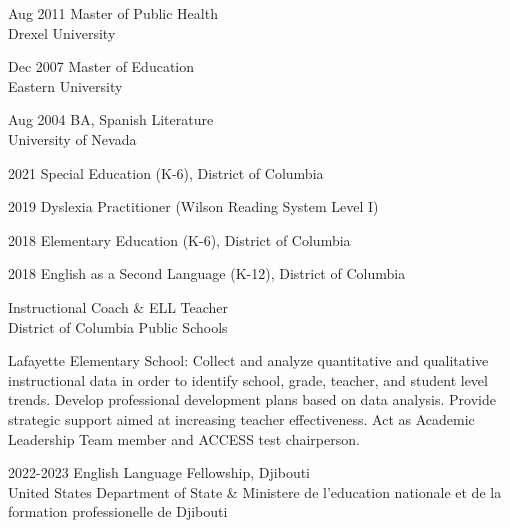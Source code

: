\documentclass[]{scrartcl}
\begin{document}
\begin{cleanCV}

  \vspace{-0.50em}

\WorkExperience
{Aug 2011}
{Master of Public Health}
{\\Drexel University}
\vspace{-0.5em}

\WorkExperience
{Dec 2007}
{Master of Education}
{\\Eastern University}
\vspace{-0.5em}

\WorkExperience
{Aug 2004}
{BA, Spanish Literature}
{\\University of Nevada}
\vspace{-0.5em}


\WorkExperience
{2021}
{}
{Special Education (K-6), District of Columbia}
\vspace{-1.25em}

\WorkExperience
{2019}
{}
{Dyslexia Practitioner (Wilson Reading System Level I)}
\vspace{-1.25em}

\WorkExperience
{2018}
{}
{Elementary Education (K-6), District of Columbia}
\vspace{-1.25em}

\WorkExperience
{2018}
{}
{English as a Second Language (K-12), District of Columbia}
\vspace{-1.25em}

\vspace{0.50em}

{Instructional Coach \& ELL Teacher}
{\\District of Columbia Public Schools}

\JobDesc{}
{Lafayette Elementary School: Collect and analyze quantitative and qualitative instructional data in order to identify school, grade, teacher, and student level trends. Develop professional development plans based on data analysis. Provide strategic support aimed at increasing teacher effectiveness. Act as Academic Leadership Team member and ACCESS test chairperson.}

\WorkExperience
{2022-2023}
{English Language Fellowship, Djibouti}
{\\United States Department of State \& Ministere de l'education nationale et de la formation professionelle de Djibouti}


\end{cleanCV}
\end{document}
